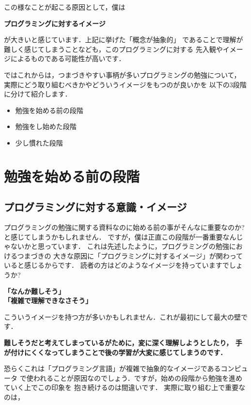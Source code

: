 \documentclass[autodetect-engine,dvi=dvipdfmx,ja=standard,a4j,12pt]{bxjsarticle}
\begin{document}
この様なことが起こる原因として，僕は
\begin{center}
    \textbf{\Large{プログラミングに対するイメージ}}
\end{center}
が大きいと感じています．上記に挙げた「概念が抽象的」
であることで理解が難しく感じてしまうことなども，このプログラミングに対する
先入観やイメージによるものである可能性が高いです．
\clearpage

ではこれからは，つまづきやすい事柄が多いプログラミングの勉強について，
実際にどう取り組むべきかやどういうイメージをもつのが良いかを
以下の3段階に分けて紹介します． 
\begin{itemize}
    \item 勉強を始める前の段階
    \item 勉強をし始めた段階
    \item 少し慣れた段階
\end{itemize}

\section{勉強を始める前の段階}

\subsection{プログラミングに対する意識・イメージ}
プログラミングの勉強に関する資料なのに始める前の事がそんなに重要なのか?と感じてしまうかもしれません．
ですが，僕は正直この段階が一番重要なんじゃないかと思っています．
これは先述したように，プログラミングの勉強におけるつまづきの
大きな原因に「プログラミングに対するイメージ」が関わっていると感じるからです．
読者の方はどのようなイメージを持っていますでしょうか?
\begin{center}
    \textbf{
        「なんか難しそう」\\
        「複雑で理解できなさそう」\\
    }
\end{center}
こういうイメージを持つ方が多いかもしれません．これが最初にして最大の壁です．
\begin{center}
    \textbf{
        難しそうだと考えてしまっているがために，変に深く理解しようとしたり，
        手が付けにくくなってしまうことで後の学習が大変に感じてしまうのです．
    }
\end{center}

恐らくこれは「プログラミング言語」が複雑で抽象的なイメージであるコンピュータ
で使われることが原因なのでしょう．ですが，始めの段階から勉強を進めていく上でこの印象を
抱き続けるのは間違いです．
実際に取り組む上で重要なのは，
\begin{center}
\end{center}
\end{document}
